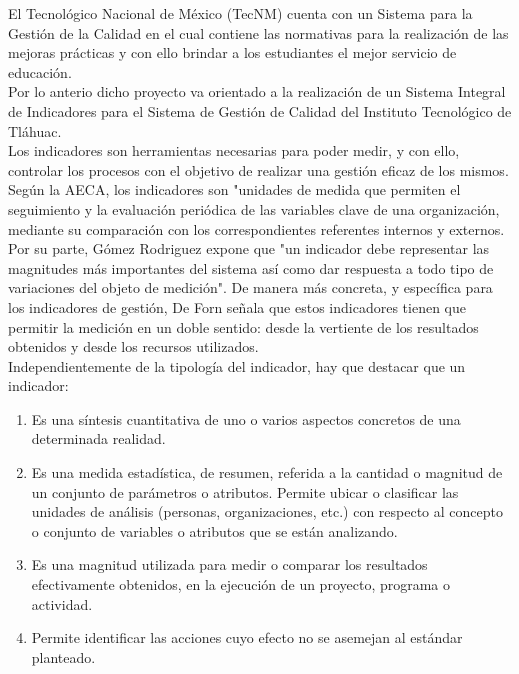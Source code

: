 	El Tecnol\'ogico Nacional de M\'exico (TecNM) cuenta con un Sistema para  la Gesti\'on de la Calidad en el cual contiene las normativas para la realizaci\'on de las mejoras pr\'acticas y con ello brindar a los estudiantes el mejor servicio de educaci\'on.\\

	Por lo anterio dicho proyecto va orientado a la realizaci\'on de un Sistema Integral de Indicadores para el Sistema de Gesti\'on de Calidad del Instituto Tecnol\'ogico de Tl\'ahuac.\\

	Los indicadores son herramientas necesarias para poder medir, y con ello, controlar los procesos con el objetivo de realizar una gesti\'on eficaz de los mismos.\\

	Seg\'un la AECA, los indicadores son "unidades de medida que permiten el seguimiento y la evaluaci\'on peri\'odica de las variables clave de una organizaci\'on, mediante su comparaci\'on con los correspondientes referentes internos y externos. Por su parte, G\'omez Rodriguez expone que "un indicador debe representar las magnitudes m\'as importantes del sistema as\'i como dar respuesta a todo tipo de variaciones del objeto de medici\'on". De manera m\'as concreta, y espec\'ifica para los indicadores de gesti\'on, De Forn se\~nala que estos indicadores tienen que permitir la medici\'on en un doble sentido: desde la vertiente de los resultados obtenidos y desde los recursos utilizados.\\

	Independientemente de la tipolog\'ia del indicador, hay que destacar que un indicador:\\

	\begin{enumerate}
		\item  Es una s\'intesis cuantitativa de uno o varios aspectos concretos de una determinada realidad.
		\item  Es una medida estad\'istica, de resumen, referida a la cantidad o magnitud de un conjunto de par\'ametros o atributos. Permite ubicar o clasificar las unidades de an\'alisis (personas, organizaciones, etc.) con respecto al concepto o conjunto de variables o atributos que se est\'an analizando.
		\item  Es una magnitud utilizada para medir o comparar los resultados efectivamente obtenidos, en la ejecuci\'on de un proyecto, programa o actividad.
		\item  Permite identificar las acciones cuyo efecto no se asemejan al est\'andar planteado.
	\end{enumerate}

